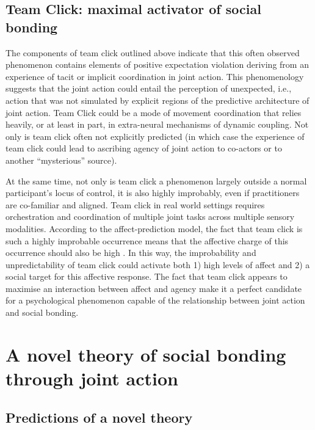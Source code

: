 \begin{CJK}{UTF8}{gbsn}
\subsection{Team Click: maximal activator of social bonding}

The components of team click outlined above indicate that this often observed phenomenon contains elements of positive expectation violation deriving from an experience of tacit or implicit coordination in joint action.  This phenomenology suggests that the joint action could entail the perception of unexpected, i.e., action that was not simulated by explicit regions of the predictive architecture of joint action.  Team Click could be a mode of movement coordination that relies heavily, or at least in part, in extra-neural mechanisms of dynamic coupling.  Not only is team click often not explicitly predicted (in which case the experience of team click could lead to ascribing agency of joint action to co-actors or to another ``mysterious'' source).

At the same time, not only is team click a phenomenon largely outside a normal participant's locus of control, it is also highly improbably, even if practitioners are co-familiar and aligned.  Team click in real world settings requires orchestration and coordination of multiple joint tasks across multiple sensory modalities.
According to the affect-prediction model, the fact that team click is such a highly improbable occurrence means that the affective charge of this occurrence should also be high \citep{Chetverikov2016}.  In this way, the improbability and unpredictability of team click could activate both 1) high levels of affect and 2) a social target for this affective response.  The fact that team click appears to maximise an interaction between affect and agency make it a perfect candidate for a psychological phenomenon capable of the relationship between joint action and social bonding.




\section{A novel theory of social bonding through joint action}



\subsection{Predictions of a novel theory}



\end{CJK}

